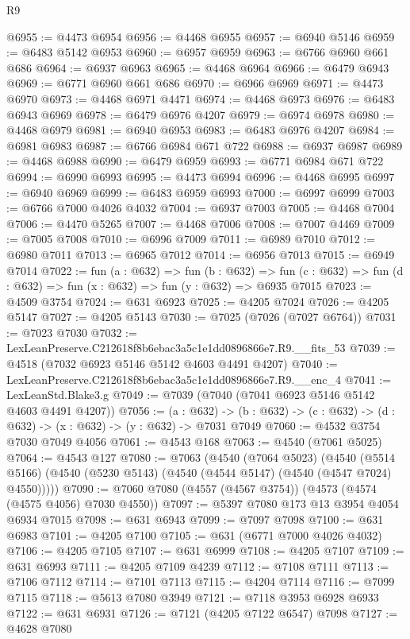 \begin{lexlean}{R9}
\begin{coremodule}
@6955 := @4473 @6954
@6956 := @4468 @6955
@6957 := @6940 @5146
@6959 := @6483 @5142 @6953
@6960 := @6957 @6959
@6963 := @6766 @6960 @661 @686
@6964 := @6937 @6963
@6965 := @4468 @6964
@6966 := @6479 @6943
@6969 := @6771 @6960 @661 @686
@6970 := @6966 @6969
@6971 := @4473 @6970
@6973 := @4468 @6971 @4471
@6974 := @4468 @6973
@6976 := @6483 @6943 @6969
@6978 := @6479 @6976 @4207
@6979 := @6974 @6978
@6980 := @4468 @6979
@6981 := @6940 @6953
@6983 := @6483 @6976 @4207
@6984 := @6981 @6983
@6987 := @6766 @6984 @671 @722
@6988 := @6937 @6987
@6989 := @4468 @6988
@6990 := @6479 @6959
@6993 := @6771 @6984 @671 @722
@6994 := @6990 @6993
@6995 := @4473 @6994
@6996 := @4468 @6995
@6997 := @6940 @6969
@6999 := @6483 @6959 @6993
@7000 := @6997 @6999
@7003 := @6766 @7000 @4026 @4032
@7004 := @6937 @7003
@7005 := @4468 @7004
@7006 := @4470 @5265
@7007 := @4468 @7006
@7008 := @7007 @4469
@7009 := @7005 @7008
@7010 := @6996 @7009
@7011 := @6989 @7010
@7012 := @6980 @7011
@7013 := @6965 @7012
@7014 := @6956 @7013
@7015 := @6949 @7014
@7022 := fun (a : @632) =>
  fun (b : @632) =>
  fun (c : @632) => fun (d : @632) => fun (x : @632) => fun (y : @632) => @6935 @7015
@7023 := @4509 @3754
@7024 := @631 @6923
@7025 := @4205 @7024
@7026 := @4205 @5147
@7027 := @4205 @5143
@7030 := @7025 (@7026 (@7027 @6764))
@7031 := @7023 @7030
@7032 := LexLeanPreserve.C212618f8b6ebac3a5c1e1dd0896866e7.R9.__fits_53
@7039 := @4518 (@7032 @6923 @5146 @5142 @4603 @4491 @4207)
@7040 := LexLeanPreserve.C212618f8b6ebac3a5c1e1dd0896866e7.R9.__enc_4
@7041 := LexLeanStd.Blake3.g
@7049 := @7039 (@7040 (@7041 @6923 @5146 @5142 @4603 @4491 @4207))
@7056 := (a : @632) ->
  (b : @632) -> (c : @632) -> (d : @632) -> (x : @632) -> (y : @632) -> @7031 @7049
@7060 := @4532 @3754 @7030 @7049 @4056
@7061 := @4543 @168
@7063 := @4540 (@7061 @5025)
@7064 := @4543 @127
@7080 := @7063
    (@4540
      (@7064 @5023)
      (@4540 (@5514 @5166) (@4540 (@5230 @5143) (@4540 (@4544 @5147) (@4540 (@4547 @7024) @4550)))))
@7090 := @7060 @7080 (@4557 (@4567 @3754)) (@4573 (@4574 (@4575 @4056) @7030 @4550))
@7097 := @5397 @7080 @173 @13 @3954 @4054 @6934 @7015
@7098 := @631 @6943
@7099 := @7097 @7098
@7100 := @631 @6983
@7101 := @4205 @7100
@7105 := @631 (@6771 @7000 @4026 @4032)
@7106 := @4205 @7105
@7107 := @631 @6999
@7108 := @4205 @7107
@7109 := @631 @6993
@7111 := @4205 @7109 @4239
@7112 := @7108 @7111
@7113 := @7106 @7112
@7114 := @7101 @7113
@7115 := @4204 @7114
@7116 := @7099 @7115
@7118 := @5613 @7080 @3949
@7121 := @7118 @3953 @6928 @6933
@7122 := @631 @6931
@7126 := @7121 (@4205 @7122 @6547) @7098
@7127 := @4628 @7080

\end{coremodule}
\end{lexlean}
